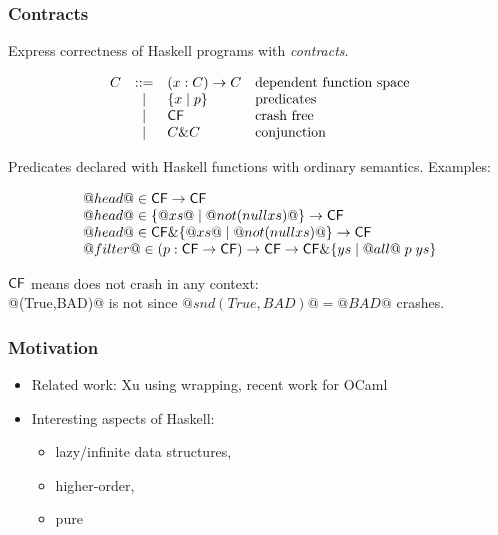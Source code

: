 \documentclass[serif,professionalfont]{beamer}
\begin{document}
\begin{frame}[fragile]
  \frametitle{Contracts}

  Express correctness of Haskell programs with \emph{contracts}.

  \[\begin{array}{lcll}
    C & ::=  & (x : C) \to C  & \text{dependent function space} \\
      & \mid & \{ x \mid p \} & \text{predicates} \\
      & \mid & \mathsf{CF}            & \text{crash free} \\
      & \mid & C \& C      & \text{conjunction} \\
  \end{array}\]

  Predicates declared with Haskell functions with ordinary semantics. Examples:

  \[\begin{array}{l}
    @head@ \in \mathsf{CF} \to \mathsf{CF} \\
    @head@ \in \{ @xs@ \mid @not (null xs)@ \} \to \mathsf{CF} \\
    @head@ \in \mathsf{CF} \& \{ @xs@ \mid @not (null xs)@ \} \to \mathsf{CF} \\
    @filter@ \in (p : \mathsf{CF} \to \mathsf{CF}) \to \mathsf{CF}
                \to \mathsf{CF} \& \{ ys \mid @all@ \; p \; ys \}
  \end{array}\]

  $\mathsf{CF}$ means does not crash in any context: \\ @(True,BAD)@ is not since
  $@snd (True,BAD)@{=}@BAD@$ crashes.

\end{frame}

\begin{frame}[fragile]
  \frametitle{Motivation}

  \begin{itemize}

    \item Related work:
      Xu using wrapping, recent work for OCaml

    \item Interesting aspects of Haskell:
      \begin{itemize}
        \item lazy/infinite data structures,
        \item higher-order,
        \item pure
      \end{itemize}
  \end{itemize}

\end{frame}
\end{document}
